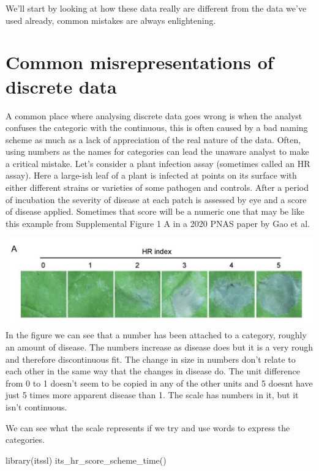 \documentclass[
]{book}
\newenvironment{Shaded}{\begin{snugshade}}{\end{snugshade}}
\newcommand{\FunctionTok}[1]{\textcolor[rgb]{0.00,0.00,0.00}{#1}}
\newcommand{\NormalTok}[1]{#1}
\begin{document}
We'll start by looking at how these data really are different from the data we've used already, common mistakes are always enlightening.

\hypertarget{common-misrepresentations-of-discrete-data}{%
\section{Common misrepresentations of discrete data}\label{common-misrepresentations-of-discrete-data}}

A common place where analysing discrete data goes wrong is when the analyst confuses the categoric with the continuous, this is often caused by a bad naming scheme as much as a lack of appreciation of the real nature of the data. Often, using numbers as the names for categories can lead the unaware analyst to make a critical mistake. Let's consider a plant infection assay (sometimes called an HR assay). Here a large-ish leaf of a plant is infected at points on its surface with either different strains or varieties of some pathogen and controls. After a period of incubation the severity of disease at each patch is assessed by eye and a score of disease applied. Sometimes that score will be a numeric one that may be like this example from Supplemental Figure 1 A in a 2020 PNAS paper by Gao et al. \citet{Gao9613}

\includegraphics{fig/dong_figs1A.png}
In the figure we can see that a number has been attached to a category, roughly an amount of disease. The numbers increase as disease does but it is a very rough and therefore discontinuous fit. The change in size in numbers don't relate to each other in the same way that the changes in disease do. The unit difference from 0 to 1 doesn't seem to be copied in any of the other units and 5 doesnt have just 5 times more apparent disease than 1. The scale has numbers in it, but it isn't continuous.

We can see what the scale represents if we try and use words to express the categories.

\begin{Shaded}
\begin{Highlighting}[]
\FunctionTok{library}\NormalTok{(itssl)}
\FunctionTok{its\_hr\_score\_scheme\_time}\NormalTok{()}
\end{Highlighting}
\end{Shaded}
\end{document}
